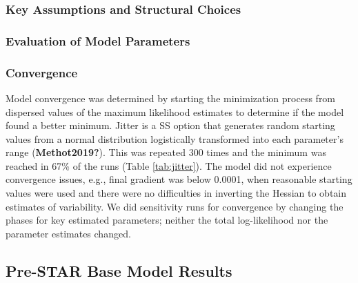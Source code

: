 \documentclass[11pt,
  english,
  a4paper,
]{article}
\begin{document}

\hypertarget{key-assumptions-and-structural-choices}{%
\subsubsection{Key Assumptions and Structural Choices}\label{key-assumptions-and-structural-choices}}

\leavevmode\tagmcend\tagstructend


\hypertarget{evaluation-of-model-parameters}{%
\subsubsection{Evaluation of Model Parameters}\label{evaluation-of-model-parameters}}

\leavevmode\tagmcend\tagstructend


\hypertarget{convergence}{%
\subsubsection{Convergence}\label{convergence}}

\leavevmode\tagmcend\tagstructend

Model convergence was determined by starting the minimization process from dispersed values of the maximum likelihood estimates to determine if the model found a better minimum. Jitter is a SS option that generates random starting values from a normal distribution logistically transformed into each parameter's range {(\textbf{Methot2019?})\leavevmode\tagmcend\tagstructend}. This was repeated 300 times and the minimum was reached in 67\% of the runs (Table \ref{tab:jitter}). The model did not experience convergence issues, e.g., final gradient was below 0.0001, when reasonable starting values were used and there were no difficulties in inverting the Hessian to obtain estimates of variability. We did sensitivity runs for convergence by changing the phases for key estimated parameters; neither the total log-likelihood nor the parameter estimates changed.


\hypertarget{pre-star-base-model-results}{%
\subsection{Pre-STAR Base Model Results}\label{pre-star-base-model-results}}
\end{document}
